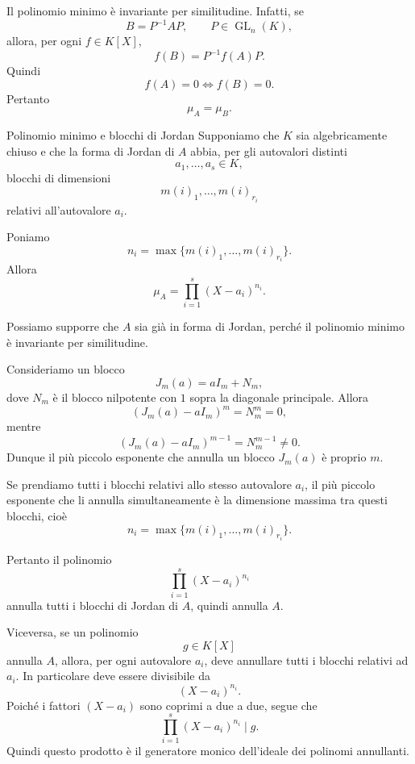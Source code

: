 \documentclass[a4paper]{article}
\begin{document}
\begin{radioactive}
\begin{snippetremark}{}
    Il polinomio minimo è invariante per similitudine. Infatti, se
    \[
        B=P^{-1}AP,
        \qquad
        P\in \operatorname{GL}_n(K),
    \]
    allora, per ogni \(f\in K[X]\),
    \[
        f(B)=P^{-1}f(A)P.
    \]
    Quindi
    \[
        f(A)=0
        \iff
        f(B)=0.
    \]
    Pertanto
    \[
        \mu_A=\mu_B.
    \]
\end{snippetremark}
\end{radioactive}

\begin{radioactive}
\begin{snippettheorem}{Polinomio minimo e blocchi di Jordan}
    Supponiamo che \(K\) sia algebricamente chiuso e che la forma di Jordan di \(A\) abbia, per gli autovalori distinti
    \[
        a_1,\ldots,a_s\in K,
    \]
    blocchi di dimensioni
    \[
        m(i)_1,\ldots,m(i)_{r_i}
    \]
    relativi all'autovalore \(a_i\).

    Poniamo
    \[
        n_i=\max\{m(i)_1,\ldots,m(i)_{r_i}\}.
    \]
    Allora
    \[
        \mu_A
        =
        \prod_{i=1}^s (X-a_i)^{n_i}.
    \]
\end{snippettheorem}
\end{radioactive}

\begin{radioactive}
\begin{snippetproof}{}
    Possiamo supporre che \(A\) sia già in forma di Jordan, perché il polinomio minimo è invariante per similitudine.

    Consideriamo un blocco
    \[
        J_m(a)=aI_m+N_m,
    \]
    dove \(N_m\) è il blocco nilpotente con \(1\) sopra la diagonale principale.
    Allora
    \[
        (J_m(a)-aI_m)^m=N_m^m=0,
    \]
    mentre
    \[
        (J_m(a)-aI_m)^{m-1}=N_m^{m-1}\neq 0.
    \]
    Dunque il più piccolo esponente che annulla un blocco \(J_m(a)\) è proprio \(m\).

    Se prendiamo tutti i blocchi relativi allo stesso autovalore \(a_i\), il più piccolo esponente che li annulla simultaneamente è la dimensione massima tra questi blocchi, cioè
    \[
        n_i=\max\{m(i)_1,\ldots,m(i)_{r_i}\}.
    \]

    Pertanto il polinomio
    \[
        \prod_{i=1}^s (X-a_i)^{n_i}
    \]
    annulla tutti i blocchi di Jordan di \(A\), quindi annulla \(A\).

    Viceversa, se un polinomio
    \[
        g\in K[X]
    \]
    annulla \(A\), allora, per ogni autovalore \(a_i\), deve annullare tutti i blocchi relativi ad \(a_i\). In particolare deve essere divisibile da
    \[
        (X-a_i)^{n_i}.
    \]
    Poiché i fattori \((X-a_i)\) sono coprimi a due a due, segue che
    \[
        \prod_{i=1}^s (X-a_i)^{n_i}\mid g.
    \]
    Quindi questo prodotto è il generatore monico dell'ideale dei polinomi annullanti.
\end{snippetproof}
\end{radioactive}
\end{document}
